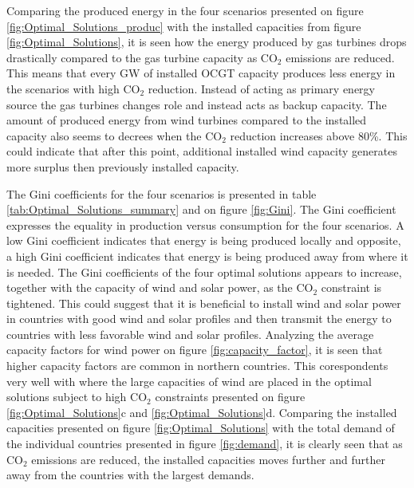 Comparing the produced energy in the four scenarios presented on figure \ref{fig:Optimal_Solutions_produc} with the installed capacities from figure \ref{fig:Optimal_Solutions}, it is seen how the energy produced by gas turbines drops drastically compared to the gas turbine capacity as $\text{CO}_2$ emissions are reduced. This means that every GW of installed OCGT capacity produces less energy in the scenarios with high $\text{CO}_2$ reduction. Instead of acting as primary energy source the gas turbines changes role and instead acts as backup capacity. The amount of produced energy from wind turbines compared to the installed capacity also seems to decrees when the $\text{CO}_2$ reduction increases above 80\%. This could indicate that after this point, additional installed wind capacity generates more surplus then previously installed capacity. 


The Gini coefficients for the four scenarios is presented in table \ref{tab:Optimal_Solutions_summary} and on figure \ref{fig:Gini}. The Gini coefficient expresses the equality in production versus consumption for the four scenarios. A low Gini coefficient indicates that energy is being produced locally and opposite, a high Gini coefficient indicates that energy is being produced away from where it is needed. The Gini coefficients of the four optimal solutions appears to increase, together with the capacity of wind and solar power, as the $\text{CO}_2$ constraint is tightened. This could suggest that it is beneficial to install wind and solar power in countries with good wind and solar profiles and then transmit the energy to countries with less favorable wind and solar profiles. Analyzing the average capacity factors for wind power on figure \ref{fig:capacity_factor}, it is seen that higher capacity factors are common in northern countries. This corespondents very well with where the large capacities of wind are placed in the optimal solutions subject to high $\text{CO}_2$ constraints presented on figure \ref{fig:Optimal_Solutions}c and \ref{fig:Optimal_Solutions}d. Comparing the installed capacities presented on figure \ref{fig:Optimal_Solutions} with the total demand of the individual countries presented in figure \ref{fig:demand}, it is clearly seen that as $\text{CO}_2$ emissions are reduced, the installed capacities moves further and further away from the countries with the largest demands. 


